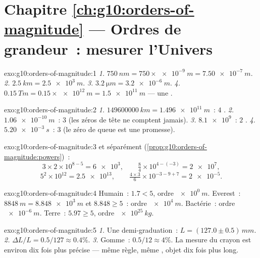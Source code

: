 \section*{Chapitre \ref{ch:g10:orders-of-magnitude} --- Ordres de grandeur~: mesurer l'Univers}

\begin{solution}{exo:g10:orders-of-magnitude:1}
\emph{1.} $\qty{750}{nm} = 750 \times \qty{e-9}{m} = \qty{7.50e-7}{m}$.
\emph{2.} $\qty{2.5}{km} = \qty{2.5e3}{m}$.
\emph{3.} $\qty{3.2}{\micro m} = \qty{3.2e-6}{m}$.
\emph{4.} $\qty{0.15}{Tm} = 0.15 \times \qty{e12}{m} = \qty{1.5e11}{m}$
--- une .
\end{solution}

\begin{solution}{exo:g10:orders-of-magnitude:2}
\emph{1.} $\qty{149600000}{km} = \qty{1.496e11}{m}$~: $4$ .
\emph{2.} $\qty{1.06e-10}{m}$~: $3$  (les zéros
de tête ne comptent jamais).
\emph{3.} $\num{8.1e9}$~: $2$ .
\emph{4.} $\qty{5.20e-3}{s}$~: $3$  (le zéro
de queue est une promesse).
\end{solution}

\begin{solution}{exo:g10:orders-of-magnitude:3}
 et  séparément
(\cref{prop:g10:orders-of-magnitude:powers})~:
\[
3 \times 2 \times 10^{8-5} = \num{6e3}, \qquad
\tfrac{8}{4} \times 10^{4-(-3)} = \num{2e7},
\]
\[
5^{2} \times 10^{12} = \num{2.5e13}, \qquad
\tfrac{4 \times 3}{6} \times 10^{-3-9+7} = \num{2e-5} .
\]
\end{solution}

\begin{solution}{exo:g10:orders-of-magnitude:4}
Humain~: $1.7 < 5$, ordre $\qty{e0}{m}$. Everest~:
$\qty{8848}{m} = \qty{8.848e3}{m}$ et $8.848 \geq 5$~: ordre
$\qty{e4}{m}$. Bactérie~: ordre $\qty{e-6}{m}$. Terre~:
$5.97 \geq 5$, ordre $\qty{e25}{kg}$.
\end{solution}

\begin{solution}{exo:g10:orders-of-magnitude:5}
\emph{1.} Une demi-graduation~: $L = (127.0 \pm 0.5)\,\unit{mm}$.
\emph{2.} $\Delta L / L = 0.5/127 \approx 0.4\%$.
\emph{3.} Gomme~: $0.5/12 \approx 4\%$. La mesure du crayon est
environ dix fois plus précise --- même règle, même , objet dix fois plus long.
\end{solution}

